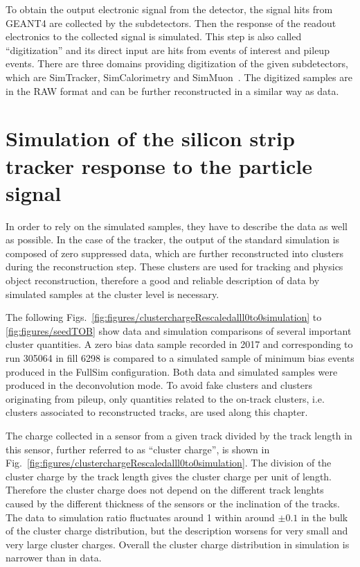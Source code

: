 To obtain the output electronic signal from the detector, the signal hits from GEANT4 are collected by the subdetectors. Then the response of the readout electronics to the collected signal is simulated. This step is also called ``digitization'' and its direct input are hits from events of interest and pileup events. There are three domains providing digitization of the given subdetectors, which are SimTracker, SimCalorimetry and SimMuon~\cite{website:simdigi}. The digitized samples are in the RAW format and can be further reconstructed in a similar way as data.


\section{Simulation of the silicon strip tracker response to the particle signal~\label{sec:trackerSimu}}

In order to rely on the simulated samples, they have to describe the data as well as possible. In the case of the tracker, the output of the standard simulation is composed of zero suppressed data, which are further reconstructed into clusters during the reconstruction step. These clusters are used for tracking and physics object reconstruction, therefore a good and reliable description of data by simulated samples at the cluster level is necessary.

The following Figs.~\ref{fig:figures/clusterchargeRescaledalll0to0simulation} to \ref{fig:figures/seedTOB} show data and simulation comparisons of several important cluster quantities. A zero bias data sample recorded in 2017 and corresponding to run 305064 in fill 6298 is compared to a simulated sample of minimum bias events produced in the FullSim configuration. Both data and simulated samples were produced in the deconvolution mode. To avoid fake clusters and clusters originating from pileup, only quantities related to the on-track clusters, i.e. clusters associated to reconstructed tracks, are used along this chapter.
 
The charge collected in a sensor from a given track divided by the track length in this sensor, further referred to as ``cluster charge'', is shown in Fig.~\ref{fig:figures/clusterchargeRescaledalll0to0simulation}. The division of the cluster charge by the track length gives the cluster charge per unit of length. Therefore the cluster charge does not depend on the different track lenghts caused by the different thickness of the sensors or the inclination of the tracks.  The data to simulation ratio fluctuates around 1 within around $\pm 0.1$ in the bulk of the cluster charge distribution, but the description worsens for very small and very large cluster charges. Overall the cluster charge distribution in simulation is narrower than in data. 


